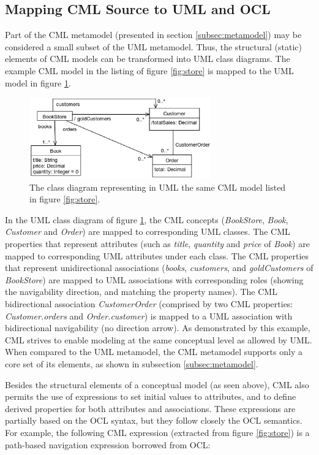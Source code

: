 \subsection{Mapping CML Source to UML and OCL}\label{subsec:mapping}

Part of the CML metamodel (presented in section \ref{subsec:metamodel}) may be considered a small subset of the UML  \cite{uml} metamodel.
Thus, the structural (static) elements of CML models can be transformed into UML class diagrams. The example CML model in the listing of figure \ref{fig:store} is mapped to the UML model in figure \ref{fig:uml}.

\begin{figure}
\centering
\includegraphics[width=0.7\textwidth]{language/diagram-uml}
\caption{The class diagram representing in UML  \cite{uml} the same CML model listed in figure \ref{fig:store}.}
\label{fig:uml}
\end{figure}

In the UML class diagram of figure \ref{fig:uml},
the CML concepts (\emph{BookStore}, \emph{Book}, \emph{Customer} and \emph{Order})
are mapped to corresponding UML classes.
The CML properties that represent attributes
(such as \emph{title}, \emph{quantity} and \emph{price} of \emph{Book})
are mapped to corresponding UML attributes under each class.
The CML properties that represent unidirectional associations
(\emph{books}, \emph{customers}, and \emph{goldCustomers} of \emph{BookStore})
are mapped to UML associations with corresponding roles
(showing the navigability direction, and matching the property names).
The CML bidirectional association \emph{CustomerOrder}
(comprised by two CML properties: \emph{Customer.orders} and \emph{Order.customer})
is mapped to a UML association with bidirectional navigability (no direction arrow).
As demonstrated by this example,
CML strives to enable modeling at the same conceptual level as allowed by UML.
When compared to the UML metamodel,
the CML metamodel supports only a core set of its elements, as shown in subsection \ref{subsec:metamodel}.

Besides the structural elements of a conceptual model (as seen above),
CML also permits the use of expressions to set initial values to attributes,
and to define derived properties for both attributes and associations.
These expressions are partially based on the OCL \cite{ocl} syntax,
but they follow closely the OCL semantics.
For example, the following CML expression (extracted from figure \ref{fig:store}) is a path-based navigation expression borrowed from OCL:

